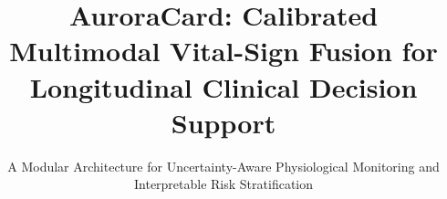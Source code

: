 \documentclass[sigconf, nonacm]{acmart}
\title{AuroraCard: Calibrated Multimodal Vital-Sign Fusion for Longitudinal Clinical Decision Support}
\subtitle{A Modular Architecture for Uncertainty-Aware Physiological Monitoring and Interpretable Risk Stratification}
\begin{document}
\begin{abstractzh}

\end{abstractzh}

\begin{abstract}

\end{abstract}

\maketitle






\hcifen{\hcbalance}\hcifzh{\hcbalance}



\end{document}
